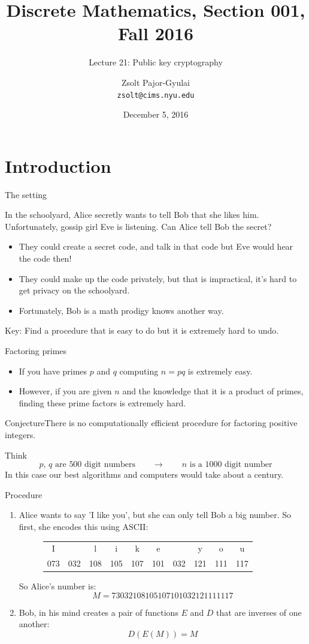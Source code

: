 \documentclass{beamer}
\title{Discrete Mathematics, Section 001, Fall 2016}
\subtitle{Lecture 21: Public key cryptography}
\date{December 5, 2016}
\author[Zsolt]{Zsolt Pajor-Gyulai \\ \texttt{zsolt@cims.nyu.edu}}
\institute[NYU] 
{
\normalsize Courant Institute of Mathematical Sciences
}
\def\bl[#1]#2{\begin{block}{#1}#2\end{block}}
\def\enumb{\begin{enumerate}}
\def\enume{\end{enumerate}}
\def\itemb{\begin{itemize}}
\def\iteme{\end{itemize}}
\begin{document}
\begin{frame}
  \titlepage
\end{frame}


\section{Introduction}

\begin{frame}{The setting}
\bl[]{In the schoolyard, Alice secretly wants to tell Bob that she likes him. Unfortunately, gossip girl Eve is listening. Can Alice tell Bob the secret?}
\itemb
\item They could create a secret code, and talk in that code but Eve would hear the code then!
\item They could make up the code privately, but that is impractical, it's hard to get privacy on the schoolyard.
\item Fortunately, Bob is a math prodigy knows another way.
\iteme
\color{red}\center Key: Find a procedure that is easy to do but it is extremely hard to undo.
\end{frame}

\begin{frame}{Factoring primes}
\itemb
\item If you have primes $p$ and $q$ computing $n=pq$ is extremely easy.
\item However, if you are given $n$ and the knowledge that it is a product of primes, finding these prime factors is extremely hard.
\iteme

\bl[Conjecture]{There is no computationally efficient procedure for factoring positive integers.}
Think 
\[
\textrm{$p$, $q$ are $500$ digit numbers}\qquad\to\qquad \textrm{$n$ is a $1000$ digit number}
\]
In this case our best algorithms and computers would take about a century.
\end{frame}

\begin{frame}{Procedure}
\enumb
\item Alice wants to say 'I like you', but she can only tell Bob a big number. So first, she encodes this using ASCII:
\begin{figure}
\centering
\begin{tabular}{cccccccccc}
I&&l&i&k&e&&y&o&u\\
073&032&108&105&107&101&032&121&111&117
\end{tabular}
\end{figure}
So Alice's number is:
\[
M=73032108105107101032121111117
\]

\item Bob, in his mind creates a pair of functions $E$ and $D$ that are inverses of one another: 
\[
D(E(M))=M
\]
\enume
\end{frame}
\end{document}
